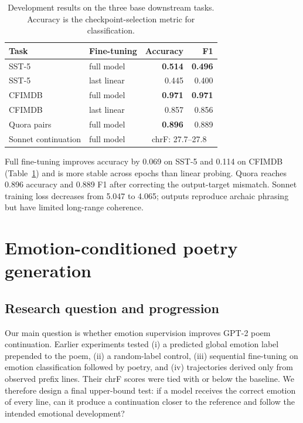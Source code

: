 \documentclass{article}
\begin{document}
\begin{table}[h!]
\caption{Development results on the three base downstream tasks. Accuracy is the checkpoint-selection metric for classification.}
\label{tab:base-results}
\centering
\small
\begin{tabular}{llrr}
\toprule
Task & Fine-tuning & Accuracy & F1 \\
\midrule
SST-5 & full model & \textbf{0.514} & \textbf{0.496} \\
SST-5 & last linear & 0.445 & 0.400 \\
CFIMDB & full model & \textbf{0.971} & \textbf{0.971} \\
CFIMDB & last linear & 0.857 & 0.856 \\
Quora pairs & full model & \textbf{0.896} & 0.889 \\
Sonnet continuation & full model & \multicolumn{2}{c}{chrF: 27.7--27.8} \\
\bottomrule
\end{tabular}
\end{table}

Full fine-tuning improves accuracy by 0.069 on SST-5 and 0.114 on CFIMDB (Table~\ref{tab:base-results}) and is more stable across epochs than linear probing. Quora reaches 0.896 accuracy and 0.889 F1 after correcting the output-target mismatch. Sonnet training loss decreases from 5.047 to 4.065; outputs reproduce archaic phrasing but have limited long-range coherence.

\section{Emotion-conditioned poetry generation}

\subsection{Research question and progression}

Our main question is whether emotion supervision improves GPT-2 poem continuation. Earlier experiments tested (i) a predicted global emotion label prepended to the poem, (ii) a random-label control, (iii) sequential fine-tuning on emotion classification followed by poetry, and (iv) trajectories derived only from observed prefix lines. Their chrF scores were tied with or below the baseline. We therefore design a final upper-bound test: if a model receives the correct emotion of every line, can it produce a continuation closer to the reference and follow the intended emotional development?
\end{document}
